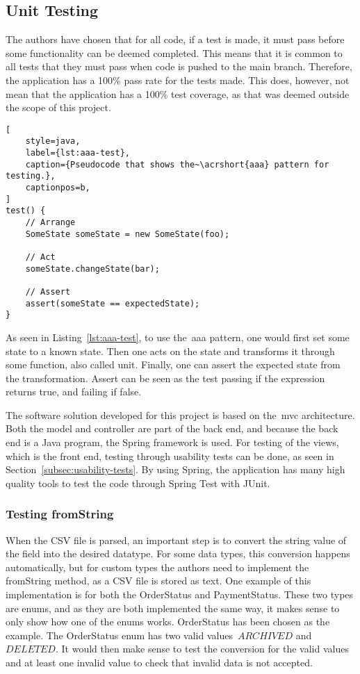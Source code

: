 \subsection{Unit Testing}\label{subsec:unit-tests}

The authors have chosen that for all code, if a test is made, it must pass before some functionality can be
deemed completed.
This means that it is common to all tests that they must pass when code is pushed to the main branch.
Therefore, the application has a 100\% pass rate for the tests made.
This does, however, not mean that the application has a 100\% test coverage, as that was deemed outside the scope of
this project.

\begin{lstlisting}[
    style=java,
    label={lst:aaa-test},
    caption={Pseudocode that shows the~\acrshort{aaa} pattern for testing.},
    captionpos=b,
]
test() {
    // Arrange
    SomeState someState = new SomeState(foo);

    // Act
    someState.changeState(bar);

    // Assert
    assert(someState == expectedState);
}
\end{lstlisting}

As seen in Listing~\ref{lst:aaa-test}, to use the~\acrshort{aaa} pattern,
one would first set some state to a known state.
Then one acts on the state and transforms it through some function, also called unit.
Finally, one can assert the expected state from the transformation.
Assert can be seen as the test passing if the expression returns true, and failing if false.

The software solution developed for this project is based on the~\acrfull{mvc} architecture.
Both the model and controller are part of the back end, and because the back end is a Java program,
the Spring framework is used.
For testing of the views, which is the front end, testing through usability tests can be done, as seen in
Section~\ref{subsec:usability-tests}.
By using Spring, the application has many high quality tools to test the code through Spring Test with JUnit.

\subsubsection{Testing fromString}\label{subsubsec:fromstring-unit-test}

When the CSV file is parsed, an important step is to convert the string value of the field into the desired
datatype.
For some data types, this conversion happens automatically, but for custom types the authors need to implement the
fromString method, as a CSV file is stored as text.
One example of this implementation is for both the OrderStatus and PaymentStatus.
These two types are enums, and as they are both implemented the same way, it makes sense to only show how one of the
enums works.
OrderStatus has been chosen as the example.
The OrderStatus enum has two valid values~\(ARCHIVED\) and~\(DELETED\).
It would then make sense to test the conversion for the valid values and at least one invalid value to check that
invalid data is not accepted.


